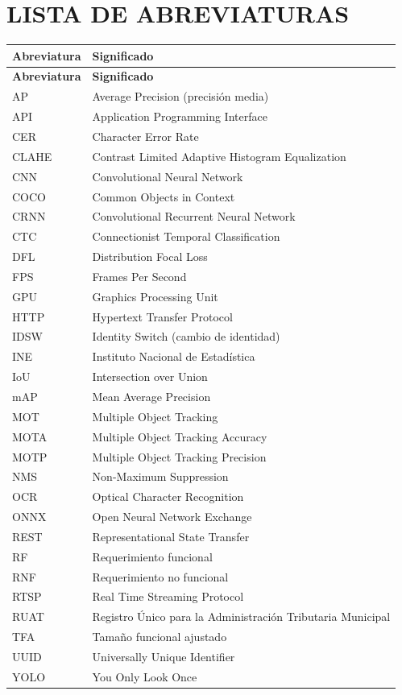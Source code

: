 \section*{LISTA DE ABREVIATURAS}

\begin{longtable}{@{}p{}p{}@{}}
    \toprule
    \textbf{Abreviatura} & \textbf{Significado} \\
    \midrule
    \endfirsthead

    \toprule
    \textbf{Abreviatura} & \textbf{Significado} \\
    \midrule
    \endhead

    AP    & Average Precision (precisión media) \\
    API   & Application Programming Interface \\
    CER   & Character Error Rate \\
    CLAHE & Contrast Limited Adaptive Histogram Equalization \\
    CNN   & Convolutional Neural Network \\
    COCO  & Common Objects in Context \\
    CRNN  & Convolutional Recurrent Neural Network \\
    CTC   & Connectionist Temporal Classification \\
    DFL   & Distribution Focal Loss \\
    FPS   & Frames Per Second \\
    GPU   & Graphics Processing Unit \\
    HTTP  & Hypertext Transfer Protocol \\
    IDSW  & Identity Switch (cambio de identidad) \\
    INE   & Instituto Nacional de Estadística \\
    IoU   & Intersection over Union \\
    mAP   & Mean Average Precision \\
    MOT   & Multiple Object Tracking \\
    MOTA  & Multiple Object Tracking Accuracy \\
    MOTP  & Multiple Object Tracking Precision \\
    NMS   & Non-Maximum Suppression \\
    OCR   & Optical Character Recognition \\
    ONNX  & Open Neural Network Exchange \\
    REST  & Representational State Transfer \\
    RF    & Requerimiento funcional \\
    RNF   & Requerimiento no funcional \\
    RTSP  & Real Time Streaming Protocol \\
    RUAT  & Registro Único para la Administración Tributaria Municipal \\
    TFA   & Tamaño funcional ajustado \\
    UUID  & Universally Unique Identifier \\
    YOLO  & You Only Look Once \\
    \bottomrule
\end{longtable}
